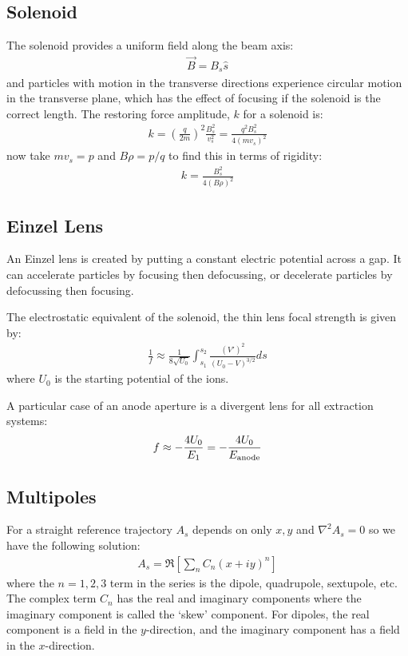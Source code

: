 \documentclass{article}
\numberwithin{equation}{section}
\begin{document}
\subsection{Solenoid}
The solenoid provides a uniform field along the beam axis:
\begin{align}
\vec{B} = B_s \hat{s}
\end{align}
and particles with motion in the transverse directions experience circular motion in the transverse plane, which has the effect of focusing if the solenoid is the correct length.
The restoring force amplitude, $k$ for a solenoid is:
\begin{align}
k = \left( \frac{q}{2m}\right)^2 \frac{B_s^2}{v_s^2} = \frac{ q^2 B_s^2}{4 (m v_s)^2}
\end{align}
now take $mv_s = p$ and $B\rho = p/q$ to find this in terms of rigidity:
\begin{align}
k = \frac{B_s^2}{4(B \rho)^2}
\end{align}

\subsection{Einzel Lens}
An Einzel lens is created by putting a constant electric potential across a gap. It can accelerate particles by focusing then defocussing, or decelerate particles by defocussing then focusing. 

The electrostatic equivalent of the solenoid, the thin lens focal strength is given by:
\begin{align}
\frac{1}{f} \approx \frac{1}{8\sqrt{U_0}} \int_{s_1}^{s_2} \frac{(V')^2}{(U_0-V)^{3/2}}ds
\end{align}
where $U_0$ is the starting potential of the ions. 

A particular case of an anode aperture is a divergent lens for all extraction systems:
\begin{align}
f \approx -\frac{4U_0}{E_1} = - \frac{4U_0}{E_{\rm anode}}
\end{align}

\subsection{ Multipoles }
For a straight reference trajectory $A_s$ depends on only $x,y$ and $\nabla^2 A_s = 0$ so we have the following solution:
\begin{align}
A_s = \Re \left[ \sum_n C_n (x + iy)^n \right]
\end{align}
where the $n = 1,2,3$ term in the series is the dipole, quadrupole, sextupole, etc. The complex term $C_n$ has the real and imaginary components where the imaginary component is called the `skew' component. For dipoles, the real component is a field in the $y$-direction, and the imaginary component has a field in the $x$-direction.
\end{document}
